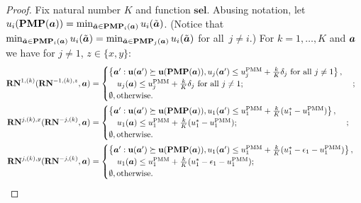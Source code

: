 \documentclass[sigconf]{aamas}
\newcommand{\epsdeltaone}{\epsilon_1}
\newcommand{\bestparetopayoffone}{u^*_1}
\newcommand{\selection}{sel}%
\newcommand{\renegb}{\mathbf{\selection}}
\theoremstyle{definition}
\begin{document}
\begin{proof}
\par Fix natural number $K$ and \selfunction{} function 
$\renegb$.
Abusing notation,
let~$u_i(\mathbf{PMP}(\boldsymbol{a})) = \min_{\tilde{\boldsymbol{a}} \in \mathbf{PMP}_i(\boldsymbol{a})} u_i(\tilde{\boldsymbol{a}})$. (Notice that $\min_{\tilde{\boldsymbol{a}} \in \mathbf{PMP}_i(\boldsymbol{a})} u_i(\tilde{\boldsymbol{a}}) = \min_{\tilde{\boldsymbol{a}} \in \mathbf{PMP}_j(\boldsymbol{a})} u_i(\tilde{\boldsymbol{a}})$
for all~$j \neq i$.)
For $k=1,\dots, K$ and $\boldsymbol{a}$ 
we have for $j \neq 1$, $z \in \{x, y\}$:
%
\begin{equation*}
   \begin{aligned}
       \reneg^{1,(k)}(\reneg^{-1,(k),z}, \fullact) & =  
       \begin{cases}
       \left\{\fullact': \fullpay(\fullact') \succeq \fullpay(\yudproj(\fullact)), \payj(\fullact') \leq 
       \pmmj + \frac{k}{K}\delta_j \text{ for all $j \neq 1$}\right\}, \\
       \ \ \ \payj(\fullact) \leq 
       \pmmj + \frac{k}{K}\delta_j \text{ for all $j \neq 1$};\\
       \emptyset, \mathrm{ otherwise}.\end{cases};\\
       \reneg^{j,(k),x}(\reneg^{-j,(k)}, \fullact) & =  
       \begin{cases}
       \left\{\fullact': \fullpay(\fullact') \succeq \fullpay(\yudproj(\fullact)), u_1(\fullact') \leq \pmmone + \frac{k}{K}(\bestparetopayoffone-\pmmone) \right\}, \\
       \ \ \ u_1(\fullact) \leq \pmmone + \frac{k}{K}(\bestparetopayoffone - \pmmone);\\ 
       \emptyset, \mathrm{ otherwise}.\end{cases};\\
       \reneg^{j,(k),y}(\reneg^{-j,(k)}, \fullact) & =  
       \begin{cases}
       \left\{\fullact': \fullpay(\fullact') \succeq \fullpay(\yudproj(\fullact)), u_1(\fullact') \leq \pmmone + \frac{k}{K}(\bestparetopayoffone-\epsdeltaone-\pmmone) \right\}, \\
       \ \ \ u_1(\fullact) \leq \pmmone + \frac{k}{K}(\bestparetopayoffone - \epsdeltaone - \pmmone);\\ 
       \emptyset, \mathrm{ otherwise}.\end{cases}\\
   \end{aligned} 
\end{equation*}

\end{proof}
\end{document}
